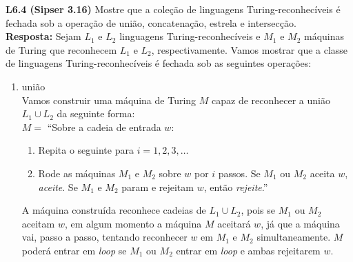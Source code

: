 
\noindent \textbf{L6.4 (Sipser 3.16)} Mostre que a coleção de linguagens Turing-reconhecíveis é fechada sob a operação de união, concatenação, estrela e intersecção.\\[6pt]
\textbf{Resposta: } Sejam $L_1$ e $L_2$ linguagens Turing-reconhecíveis e $M_1$ e $M_2$ máquinas de Turing que reconhecem $L_1$ e $L_2$, respectivamente. Vamos mostrar que a classe de linguagens Turing-reconhecíveis é fechada sob as seguintes operações:
\begin{enumerate}[label={\textbf{\alph*.}}]
    \item união\\[3pt]
    Vamos construir uma máquina de Turing $M$ capaz de reconhecer a união $L_1 \cup L_2$ da seguinte forma:\\[3pt]
    $M =$ “Sobre a cadeia de entrada $w$:
    \begin{enumerate}[label={\textbf{\arabic*.}}, leftmargin=1in]
        \item Repita o seguinte para $i = 1, 2, 3, \ldots$
    
        \item Rode as máquinas $M_1$ e $M_2$ sobre $w$ por $i$ passos. Se $M_1$ ou $M_2$ aceita $w$, \textit{aceite}. Se $M_1$ e $M_2$ param e rejeitam $w$, então \textit{rejeite}.”

    \end{enumerate}
    
    A máquina construída reconhece cadeias de $L_1 \cup L_2$, pois se $M_1$ ou $M_2$ aceitam $w$, em algum momento a máquina $M$ aceitará $w$, já que a máquina vai, passo a passo, tentando reconhecer $w$ em $M_1$ e $M_2$ simultaneamente. $M$ poderá entrar em \textit{loop} se $M_1$ ou $M_2$ entrar em \textit{loop} e ambas rejeitarem $w$.
    

\end{enumerate}
